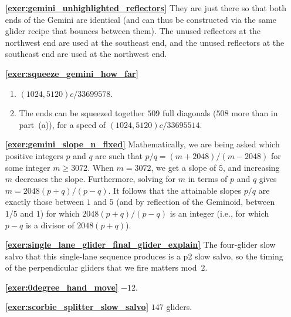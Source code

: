 \begin{multicols}{2}
	\begin{itemize}[leftmargin=0em]
		\item[\bf\color{ocre}\sffamily\ref{exer:gemini_unhighlighted_reflectors}] They are just there so that both ends of the Gemini are identical (and can thus be constructed via the same glider recipe that bounces between them). The unused reflectors at the northwest end are used at the southeast end, and the unused reflectors at the southeast end are used at the northwest end.\\
		
		\item[\bf\color{ocre}\sffamily\ref{exer:squeeze_gemini_how_far}] \begin{enumerate}[leftmargin=1.5em,label=\bf\color{ocre}(\alph*)]
			\item $(1024,5120)c/33699578$.
			
			\item The ends can be squeezed together $509$ full diagonals ($508$ more than in part~(a)), for a speed of $(1024,5120)c/33695514$.\\
		\end{enumerate}
		
		\item[\bf\color{ocre}\sffamily\ref{exer:gemini_slope_n_fixed}] Mathematically, we are being asked which positive integers $p$ and $q$ are such that $p/q = (m+2048) / (m-2048)$ for some integer $m \geq 3072$. When $m = 3072$, we get a slope of $5$, and increasing $m$ decreases the slope. Furthermore, solving for $m$ in terms of $p$ and $q$ gives $m = 2048(p+q)/(p-q)$. It follows that the attainable slopes $p/q$ are exactly those between $1$ and $5$ (and by reflection of the Geminoid, between $1/5$ and $1$) for which $2048(p+q)/(p-q)$ is an integer (i.e., for which $p-q$ is a divisor of $2048(p+q)$).\\
		
		\item[\bf\color{ocre}\sffamily\ref{exer:single_lane_glider_final_glider_explain}] The four-glider slow salvo that this single-lane sequence produces is a p2 slow salvo, so the timing of the perpendicular gliders that we fire matters mod~$2$.\\
		
		\item[\bf\color{ocre}\sffamily\ref{exer:0degree_hand_move}] $-12$.\\
		
		\item[\bf\color{ocre}\sffamily\ref{exer:scorbie_splitter_slow_salvo}] $147$ gliders.\\
		

\end{itemize}
\end{multicols}
